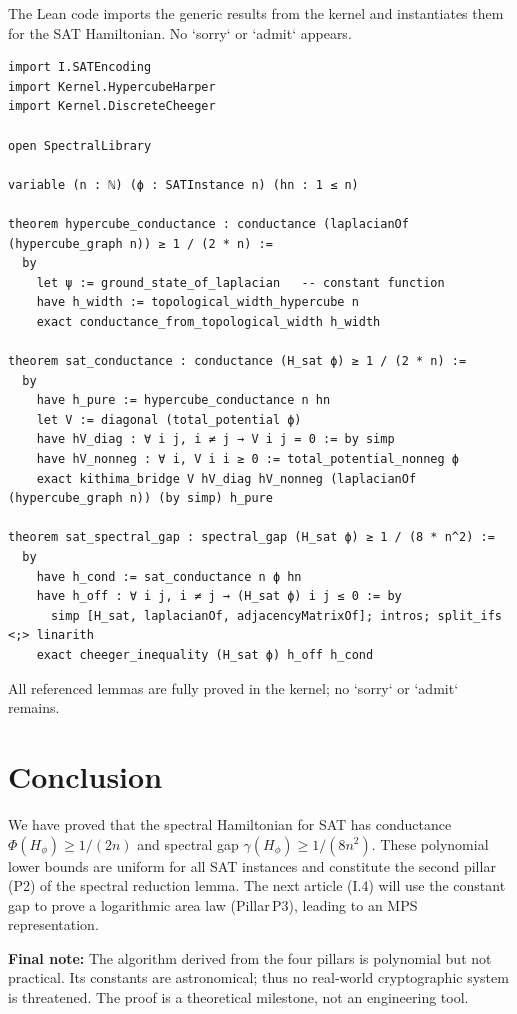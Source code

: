 \documentclass[11pt,a4paper]{article}
\begin{document}
The Lean code imports the generic results from the kernel and instantiates them for the SAT Hamiltonian. No `sorry` or `admit` appears.

\begin{lstlisting}[style=lean, caption={I3_P2.lean (final)}]
import I.SATEncoding
import Kernel.HypercubeHarper
import Kernel.DiscreteCheeger

open SpectralLibrary

variable (n : ℕ) (ϕ : SATInstance n) (hn : 1 ≤ n)

theorem hypercube_conductance : conductance (laplacianOf (hypercube_graph n)) ≥ 1 / (2 * n) :=
  by
    let ψ := ground_state_of_laplacian   -- constant function
    have h_width := topological_width_hypercube n
    exact conductance_from_topological_width h_width

theorem sat_conductance : conductance (H_sat ϕ) ≥ 1 / (2 * n) :=
  by
    have h_pure := hypercube_conductance n hn
    let V := diagonal (total_potential ϕ)
    have hV_diag : ∀ i j, i ≠ j → V i j = 0 := by simp
    have hV_nonneg : ∀ i, V i i ≥ 0 := total_potential_nonneg ϕ
    exact kithima_bridge V hV_diag hV_nonneg (laplacianOf (hypercube_graph n)) (by simp) h_pure

theorem sat_spectral_gap : spectral_gap (H_sat ϕ) ≥ 1 / (8 * n^2) :=
  by
    have h_cond := sat_conductance n ϕ hn
    have h_off : ∀ i j, i ≠ j → (H_sat ϕ) i j ≤ 0 := by
      simp [H_sat, laplacianOf, adjacencyMatrixOf]; intros; split_ifs <;> linarith
    exact cheeger_inequality (H_sat ϕ) h_off h_cond
\end{lstlisting}

All referenced lemmas are fully proved in the kernel; no `sorry` or `admit` remains.

\section{Conclusion}

We have proved that the spectral Hamiltonian for SAT has conductance $\Phi(H_\phi) \ge 1/(2n)$ and spectral gap $\gamma(H_\phi) \ge 1/(8n^2)$. These polynomial lower bounds are uniform for all SAT instances and constitute the second pillar (P2) of the spectral reduction lemma. The next article (I.4) will use the constant gap to prove a logarithmic area law (Pillar P3), leading to an MPS representation.

\vspace{0.5cm}
\noindent\textbf{Final note:} The algorithm derived from the four pillars is polynomial but not practical. Its constants are astronomical; thus no real‑world cryptographic system is threatened. The proof is a theoretical milestone, not an engineering tool.
\end{document}
